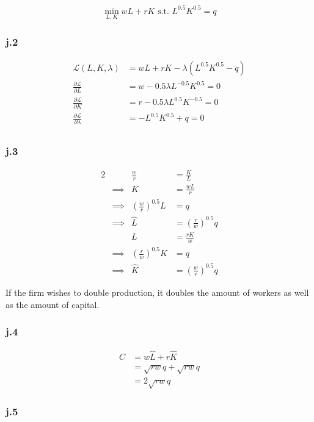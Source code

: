 \documentclass[12pt,letterpaper]{article}
\theoremstyle{definition}
\newcommand{\Lag}{\mathcal{L}}
\begin{document}
\[
  \min_{L,K} wL + rK \text{ s.t. } L^{0.5}K^{0.5} = q
\]

\subsubsection*{j.2}

\begin{align*}
  \Lag(L,K,\lambda) &= wL + rK - \lambda (L^{0.5}K^{0.5} - q) \\
  \frac{\partial \Lag}{\partial L} &= w - 0.5\lambda L^{-0.5}K^{0.5} = 0 \\
  \frac{\partial \Lag}{\partial K} &= r - 0.5\lambda L^{0.5}K^{-0.5} = 0 \\
  \frac{\partial \Lag}{\partial \lambda} &= -L^{0.5}K^{0.5} + q = 0 \\
\end{align*}

\subsubsection*{j.3}

\begin{alignat*}{2}
  && \frac{w}{r} &= \frac{K}{L} \\
  &\implies& K &= \frac{wL}{r} \\
  &\implies& (\frac{w}{r})^{0.5}L &= q \\
  &\implies& \hat{L} &= (\frac{r}{w})^{0.5}q \\
  && L &= \frac{rK}{w} \\
  &\implies& (\frac{r}{w})^{0.5} K &= q \\
  &\implies& \hat{K} &= (\frac{w}{r})^{0.5}q
\end{alignat*}

If the firm wishes to double production, it doubles the amount of workers as
well as the amount of capital.

\subsubsection*{j.4}

\begin{align*}
  C &= w\hat{L} + r\hat{K} \\
    &= \sqrt{rw}q + \sqrt{rw}q \\
    &= 2\sqrt{rw}q
\end{align*}

\subsubsection*{j.5}
\end{document}
